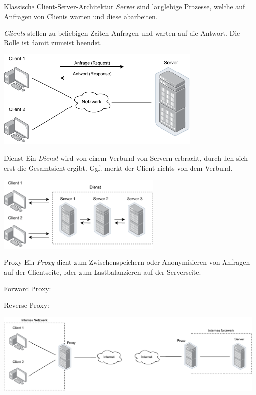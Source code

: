 \begin{defi}{Klassische Client-Server-Architektur}
    \emph{Server} sind langlebige Prozesse, welche auf Anfragen von Clients warten und diese abarbeiten.

    \emph{Clients} stellen zu beliebigen Zeiten Anfragen und warten auf die Antwort.
    Die Rolle ist damit zumeist beendet.

    \begin{center}
        \includegraphics[width=0.75\textwidth]{includes/figures/defi_client_server.pdf}
    \end{center}
\end{defi}

\begin{bonus}{Dienst}
    Ein \emph{Dienst} wird von einem Verbund von Servern erbracht, durch den sich erst die Gesamtsicht ergibt.
    Ggf. merkt der Client nichts von dem Verbund.

    \begin{center}
        \includegraphics[width=0.6\textwidth]{includes/figures/bonus_dienst.pdf}
    \end{center}
\end{bonus}

\begin{bonus}{Proxy}
    Ein \emph{Proxy} dient zum Zwischenspeichern oder Anonymisieren von Anfragen auf der Clientseite, oder zum Lastbalanzieren auf der Serverseite.

    \begin{minipage}[t]{.5\textwidth}
        Forward Proxy:
    \end{minipage}%
    \begin{minipage}[t]{.5\textwidth}
        Reverse Proxy:
    \end{minipage}

    \includegraphics[width=\textwidth]{includes/figures/bonus_proxy.pdf}
\end{bonus}

